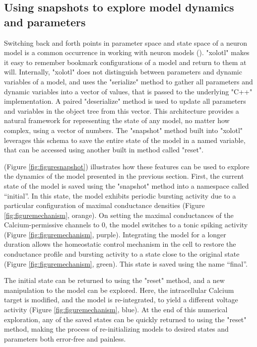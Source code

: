 \documentclass{frontiersSCNS} %
\begin{document}
%
%
%
%
%



\subsection{Using snapshots to explore model dynamics and parameters}

Switching back and forth points in parameter space and state space of a neuron model is a common occurrence in working with neuron models (\cite{deschutterConsumerGuideNeuronal1992}). "xolotl" makes it easy to remember bookmark configurations of a model and return to them at will. Internally, "xolotl" does not distinguish between parameters and dynamic variables of a model, and uses the "serialize" method to gather all parameters and dynamic variables into a vector of values, that is passed to the underlying "C++" implementation. A paired "deserialize" method is used to update all parameters and variables in the object tree from this vector. This architecture provides a natural framework for representing the state of any model, no matter how complex, using a vector of numbers. The "snapshot" method built into "xolotl" leverages this schema to save the entire state of the model in a named variable, that can be accessed using another built in method called "reset".

(Figure \ref{fig:figuresnapshot}) illustrates how these features can be used to explore the dynamics of the model presented in the previous section. First, the current state of the model is saved using the "snapshot" method into a namespace called ``initial''. In this state, the model exhibits periodic bursting activity due to a particular configuration of maximal conductance densities (Figure \ref{fig:figuremechanism}, orange).  On setting the maximal conductances of the Calcium-permissive channels to 0, the model switches to a tonic spiking activity (Figure \ref{fig:figuremechanism}, purple). Integrating the model for a longer duration allows the homeostatic control mechanism in the cell to restore the conductance profile and bursting activity to a state close to the original state (Figure \ref{fig:figuremechanism}, green). This state is saved using the name ``final''.

The initial state can be returned to using the "reset" method, and a new manipulation to the model can be explored. Here, the intracellular Calcium target is modified, and the model is re-integrated, to yield a different voltage activity (Figure \ref{fig:figuremechanism}, blue). At the end of this numerical exploration, any of the saved states can be quickly returned to using the "reset" method, making the process of re-initializing models to desired states and parameters both error-free and painless.
\end{document}
